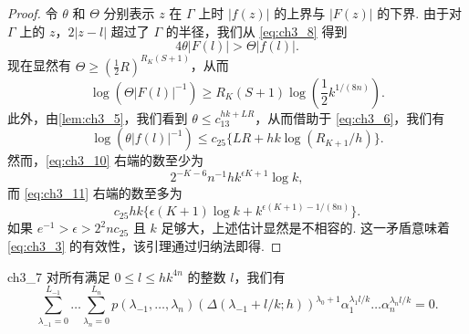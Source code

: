 \begin{proof}
令 $\theta$ 和 $\Theta$ 分别表示 $z$ 在 $\Gamma$ 上时 $|f(z)|$ 的上界与 $|F(z)|$ 的下界. 由于对 $\Gamma$ 上的 $z$，$2|z-l|$ 超过了 $\Gamma$ 的半径，我们从 \eqref{eq:ch3_8} 得到
\begin{equation} \label{eq:ch3_9}\tag{9}
4\theta |F(l)| > \Theta |f(l)|.
\end{equation}
现在显然有 $\Theta \ge (\frac{1}{2}R)^{R_K(S+1)}$，从而
\begin{equation} \label{eq:ch3_10}\tag{10}
\log \left(\Theta |F(l)|^{-1}\right) \ge R_K(S+1)\log \left(\frac{1}{2}k^{1/(8n)}\right).
\end{equation}
此外，由\autoref{lem:ch3_5}，我们看到 $\theta \le c_{13}^{hk+LR}$，从而借助于 \eqref{eq:ch3_6}，我们有
\begin{equation} \label{eq:ch3_11}\tag{11}
\log (\theta |f(l)|^{-1}) \le c_{25} \{ LR + hk \log (R_{K+1}/h) \}.
\end{equation}
然而，\eqref{eq:ch3_10} 右端的数至少为
\[
2^{-K-6}n^{-1} h k^{\epsilon K+1} \log k,
\]
而 \eqref{eq:ch3_11} 右端的数至多为
\[
c_{25} h k \{\epsilon(K+1)\log k + k^{\epsilon(K+1)-1/(8n)}\}.
\]
如果 $e^{-1} > \epsilon > 2^{2}n c_{25}$ 且 $k$ 足够大，上述估计显然是不相容的. 这一矛盾意味着 \eqref{eq:ch3_3} 的有效性，该引理通过归纳法即得.
\end{proof}

\begin{mylemma}{}{ch3_7}
对所有满足 $0 \le l \le hk^{4n}$ 的整数 $l$，我们有
\begin{equation} \label{eq:ch3_12}\tag{12}
\sum_{\lambda_{-1}=0}^{L_{-1}} \dots \sum_{\lambda_n=0}^{L_n} p(\lambda_{-1}, \dots, \lambda_n) \left( \Delta(\lambda_{-1} + l/k; h) \right)^{\lambda_0+1} \alpha_1^{\lambda_1 l/k} \dots \alpha_n^{\lambda_n l/k} = 0.
\end{equation}
\end{mylemma}

